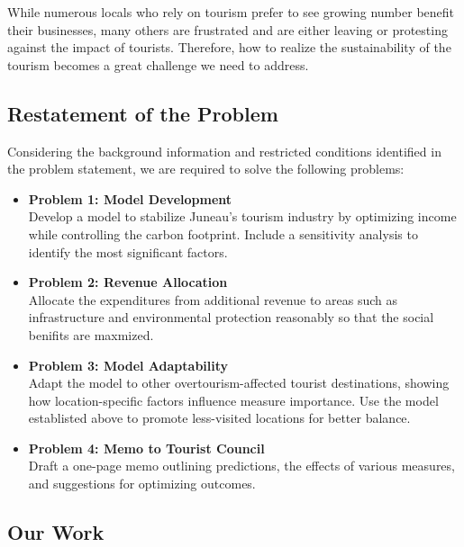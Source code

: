 \documentclass{mcmthesis}
\begin{document}
While numerous locals who rely on tourism prefer to see growing number benefit their businesses, many others are frustrated and are either leaving or protesting against the impact of tourists. 
Therefore, how to realize the sustainability of the tourism becomes a great challenge we need to address.

\subsection{Restatement of the Problem}
Considering the background information and restricted conditions identified in the problem statement, we are required to solve the following problems:
\begin{itemize}
  \item \textbf{Problem 1: Model Development} \\
    Develop a model to stabilize Juneau's tourism industry by optimizing income while controlling the carbon footprint. 
    Include a sensitivity analysis to identify the most significant factors.
    
  \item \textbf{Problem 2: Revenue Allocation} \\
    Allocate the expenditures from additional revenue to areas such as infrastructure and environmental protection reasonably so that the social benifits are maxmized.
    
  \item \textbf{Problem 3: Model Adaptability} \\
    Adapt the model to other overtourism-affected tourist destinations, showing how location-specific factors influence measure importance. 
    Use the model establisted above to promote less-visited locations for better balance.
    
  \item \textbf{Problem 4: Memo to Tourist Council} \\
    Draft a one-page memo outlining predictions, the effects of various measures, and suggestions for optimizing outcomes.
\end{itemize}


\subsection{Our Work}
\end{document}
